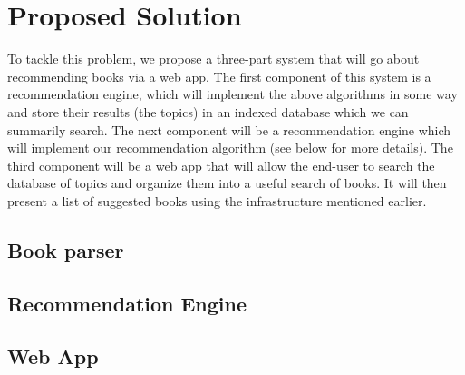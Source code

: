 
\section{Proposed Solution} 
To tackle this problem, we propose a three-part system that will go about recommending books via a web app.  
The first component of this system is a recommendation engine, which will implement the above algorithms in some way and store their results (the topics) in an indexed database which we can summarily search.  
The next component will be a recommendation engine which will implement our recommendation algorithm (see below for more details).  
The third component will be a web app that will allow the end-user to search the database of topics and organize them into a useful search of books.  
It will then present a list of suggested books using the infrastructure mentioned earlier.  

\subsection{Book parser} \label{section:book-parser}


\subsection{Recommendation Engine} \label{section:recommendation_engine}


\subsection{Web App} \label{section:webapp}

